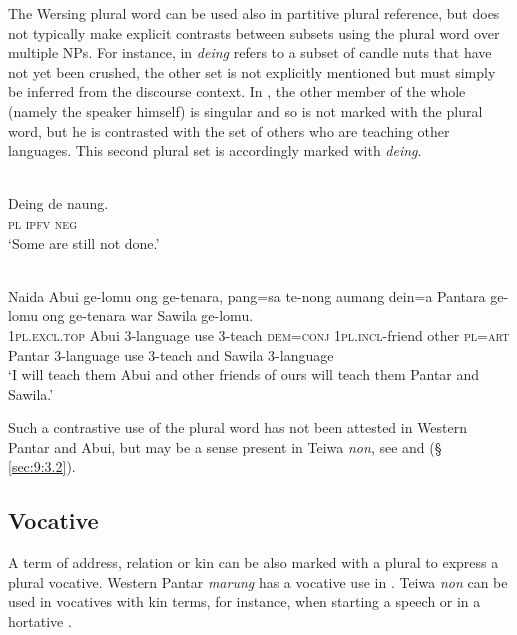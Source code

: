 The Wersing plural word can be used also in partitive plural reference, but does not typically make explicit contrasts between subsets using the plural word over multiple NPs. For instance, in  \textit{deing} refers to a subset of candle nuts that have not yet been crushed, the other set is not explicitly mentioned but must simply be inferred from the discourse context. In , the other member of the whole (namely the speaker himself) is singular and so is not marked with the plural word, but he is contrasted with the set of others who are teaching other languages. This second plural set is accordingly marked with \textit{deing}.


\ea%
\label{ex:9:86}
 \\
\gll Deing de naung. \\
 \textsc{pl} \textsc{ipfv} \textsc{neg}   \\
\glt `Some are still not done.'
\z







\ea%
\label{ex:9:87}
 \\
\gll  Naida Abui ge-lomu ong ge-tenara,  pang=sa te-nong aumang dein=a  Pantara ge-lomu ong ge-tenara war Sawila ge-lomu.\\
  \textsc{1pl.excl.top} Abui 3-language use 3-teach  \textsc{dem=conj} \textsc{1pl.incl}-friend other \textsc{pl=art}   Pantar 3-language use 3-teach and Sawila 3-language\\
\glt `I will teach them Abui and other friends of ours  will teach them Pantar and Sawila.'
\z

Such a contrastive use of the plural word has not been attested in Western Pantar and Abui, but may be a sense present in Teiwa \textit{non}, see  and  ({\S} \ref{sec:9:3.2}).

\subsection{Vocative} %
\label{sec:9:4.5}
A term of address, relation or kin can be also marked with a plural to express a plural vocative. Western Pantar \textit{marung} has a vocative use in . Teiwa \textit{non} can be used in vocatives with kin terms, for instance, when starting a speech  or in a hortative .


